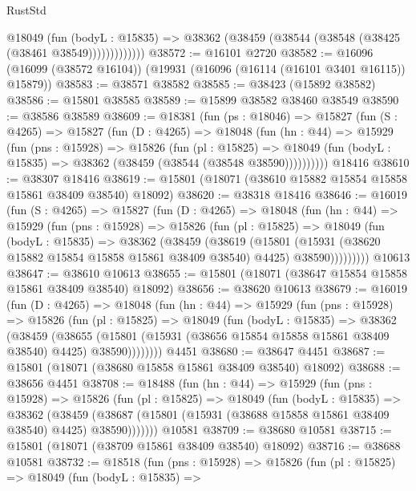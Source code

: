 \begin{lexlean}{RustStd}
\begin{coremodule}
                @18049
                  (fun (bodyL : @15835) =>
                  @38362 (@38459 (@38544 (@38548 (@38425 (@38461 @38549)))))))))))))
@38572 := @16101 @2720
@38582 := @16096 (@16099 (@38572 @16104)) (@19931 (@16096 (@16114 (@16101 @3401 @16115)) @15879))
@38583 := @38571 @38582
@38585 := @38423 (@15892 @38582)
@38586 := @15801 @38585
@38589 := @15899 @38582 @38460 @38549
@38590 := @38586 @38589
@38609 := @18381
    (fun (ps : @18046) =>
    @15827
      (fun (S : @4265) =>
      @15827
        (fun (D : @4265) =>
        @18048
          (fun (hn : @44) =>
          @15929
            (fun (pns : @15928) =>
            @15826
              (fun (pl : @15825) =>
              @18049 (fun (bodyL : @15835) => @38362 (@38459 (@38544 (@38548 @38590))))))))))
    @18416
@38610 := @38307 @18416
@38619 := @15801 (@18071 (@38610 @15882 @15854 @15858 @15861 @38409 @38540) @18092)
@38620 := @38318 @18416
@38646 := @16019
    (fun (S : @4265) =>
    @15827
      (fun (D : @4265) =>
      @18048
        (fun (hn : @44) =>
        @15929
          (fun (pns : @15928) =>
          @15826
            (fun (pl : @15825) =>
            @18049
              (fun (bodyL : @15835) =>
              @38362
                (@38459
                  (@38619
                    (@15801
                      (@15931 (@38620 @15882 @15854 @15858 @15861 @38409 @38540) @4425)
                      @38590)))))))))
    @10613
@38647 := @38610 @10613
@38655 := @15801 (@18071 (@38647 @15854 @15858 @15861 @38409 @38540) @18092)
@38656 := @38620 @10613
@38679 := @16019
    (fun (D : @4265) =>
    @18048
      (fun (hn : @44) =>
      @15929
        (fun (pns : @15928) =>
        @15826
          (fun (pl : @15825) =>
          @18049
            (fun (bodyL : @15835) =>
            @38362
              (@38459
                (@38655
                  (@15801 (@15931 (@38656 @15854 @15858 @15861 @38409 @38540) @4425) @38590))))))))
    @4451
@38680 := @38647 @4451
@38687 := @15801 (@18071 (@38680 @15858 @15861 @38409 @38540) @18092)
@38688 := @38656 @4451
@38708 := @18488
    (fun (hn : @44) =>
    @15929
      (fun (pns : @15928) =>
      @15826
        (fun (pl : @15825) =>
        @18049
          (fun (bodyL : @15835) =>
          @38362
            (@38459
              (@38687 (@15801 (@15931 (@38688 @15858 @15861 @38409 @38540) @4425) @38590)))))))
    @10581
@38709 := @38680 @10581
@38715 := @15801 (@18071 (@38709 @15861 @38409 @38540) @18092)
@38716 := @38688 @10581
@38732 := @18518
    (fun (pns : @15928) =>
    @15826
      (fun (pl : @15825) =>
      @18049
        (fun (bodyL : @15835) =>

\end{coremodule}
\end{lexlean}
